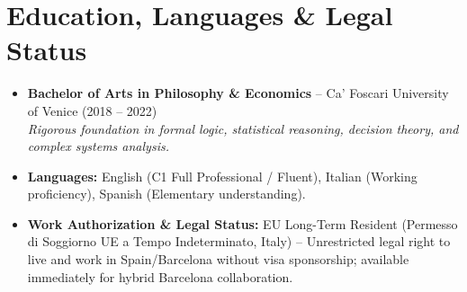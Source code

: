 \documentclass[a4paper,10pt]{article}
\begin{document}
\section{Education, Languages \& Legal Status}
\begin{itemize}
  \item \textbf{Bachelor of Arts in Philosophy \& Economics} -- Ca' Foscari University of Venice (2018 -- 2022) \\
  \textit{Rigorous foundation in formal logic, statistical reasoning, decision theory, and complex systems analysis.}
  \item \textbf{Languages:} English (C1 Full Professional / Fluent), Italian (Working proficiency), Spanish (Elementary understanding).
  \item \textbf{Work Authorization \& Legal Status:} EU Long-Term Resident (Permesso di Soggiorno UE a Tempo Indeterminato, Italy) -- Unrestricted legal right to live and work in Spain/Barcelona without visa sponsorship; available immediately for hybrid Barcelona collaboration.
\end{itemize}
\end{document}
